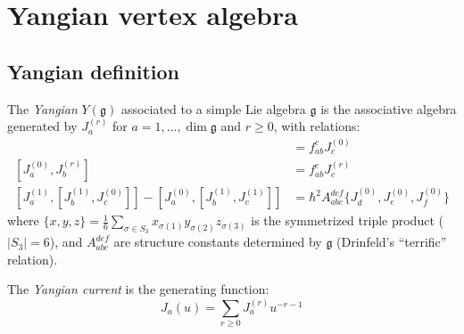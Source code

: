 \section{Yangian vertex algebra}
\label{sec:yangian-vertex}

\subsection{Yangian definition}

\begin{definition}[Yangian]\label{def:yangian}
The \emph{Yangian} $Y(\mathfrak{g})$ associated to a simple Lie algebra $\mathfrak{g}$ 
is the associative algebra generated by $J^{(r)}_a$ for $a = 1, \ldots, \dim\mathfrak{g}$ 
and $r \geq 0$, with relations:
\begin{align*}
[J^{(0)}_a, J^{(0)}_b] &= f_{ab}^c J^{(0)}_c \\
[J^{(0)}_a, J^{(r)}_b] &= f_{ab}^c J^{(r)}_c \\
[J^{(1)}_a, [J^{(1)}_b, J^{(0)}_c]] - [J^{(0)}_a, [J^{(1)}_b, J^{(1)}_c]] &= \hbar^2 A_{abc}^{def} \{J^{(0)}_d, J^{(0)}_e, J^{(0)}_f\}
\end{align*}
where $\{x,y,z\} = \frac{1}{6}\sum_{\sigma \in S_3} x_{\sigma(1)}y_{\sigma(2)}z_{\sigma(3)}$ is the symmetrized triple product ($|S_3| = 6$), and $A_{abc}^{def}$ are structure constants determined by $\mathfrak{g}$ (Drinfeld's ``terrific'' relation).
\end{definition}

\begin{definition}\label{def:yangian-current}
The \emph{Yangian current} is the generating function:
\[
J_a(u) = \sum_{r \geq 0} J^{(r)}_a u^{-r-1}
\]
\end{definition}

